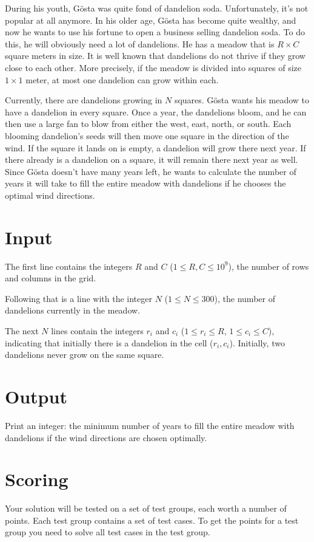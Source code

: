 \noindent
During his youth, Gösta was quite fond of dandelion soda. 
Unfortunately, it's not popular at all anymore. 
In his older age, Gösta has become quite wealthy, and now he wants to use his fortune to open a business selling dandelion soda. 
To do this, he will obviously need a lot of dandelions. He has a meadow that is $R \times C$ square meters in size. 
It is well known that dandelions do not thrive if they grow close to each other. 
More precisely, if the meadow is divided into squares of size $1 \times 1$ meter, at most one dandelion can grow within each.

Currently, there are dandelions growing in $N$ squares. 
Gösta wants his meadow to have a dandelion in every square. 
Once a year, the dandelions bloom, and he can then use a large fan to blow from either the west, east, north, or south. 
Each blooming dandelion's seeds will then move one square in the direction of the wind. 
If the square it lands on is empty, a dandelion will grow there next year. 
If there already is a dandelion on a square, it will remain there next year as well. 
Since Gösta doesn't have many years left, he wants to calculate the number of years it will take to fill the entire meadow with dandelions if he chooses the optimal wind directions.


\section*{Input}
\noindent
The first line contains the integers $R$ and $C$ ($1 \leq R,C \leq 10^9$), the number of rows and columns in the grid.

Following that is a line with the integer $N$ ($1 \leq N \leq 300$), the number of dandelions currently in the meadow.

The next $N$ lines contain the integers $r_i$ and $c_i$ ($1 \leq r_i \leq R$, $1 \leq c_i \leq C$), 
indicating that initially there is a dandelion in the cell ($r_i, c_i$). Initially, two dandelions never grow on the same square.

\section*{Output}
\noindent
Print an integer: the minimum number of years to fill the entire meadow with dandelions if the wind directions are chosen optimally.

\section*{Scoring}
Your solution will be tested on a set of test groups, each worth a number of points. 
Each test group contains a set of test cases. 
To get the points for a test group you need to solve all test cases in the test group.

